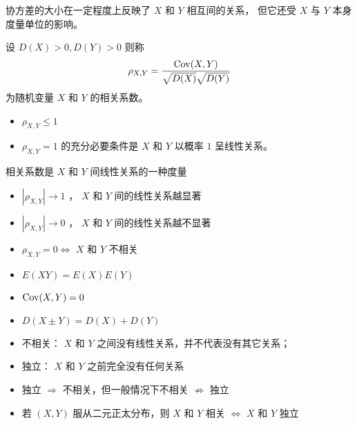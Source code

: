  协方差的大小在一定程度上反映了 $ X $ 和 $ Y $ 相互间的关系，
但它还受 $ X $ 与 $ Y $ 本身度量单位的影响。

 设 $ D(X) > 0, D(Y) > 0 $ 则称
\begin{equation}
    \rho_{X,Y} = \frac{\mathrm{Cov}(X,Y)}{\sqrt{D(X)}\sqrt{D(Y)}}
\end{equation}
为随机变量 $ X $ 和 $ Y $ 的相关系数。

\begin{itemize}[leftmargin=\subparitemindent]
    \item $ \rho_{X,Y} \leqslant 1 $
    \item $ \rho_{X,Y} = 1 $ 的充分必要条件是 $ X $ 和 $ Y $ 以概率 $ 1 $ 呈线性关系。
\end{itemize}

 相关系数是 $ X $ 和 $ Y $ 间线性关系的一种度量
\begin{itemize}[leftmargin=\subparitemindent]
    \item $ \left| \rho_{X,Y} \right| \rightarrow 1 $ ， $ X $ 和 $ Y $ 间的线性关系越显著
    \item $ \left| \rho_{X,Y} \right| \rightarrow 0 $ ， $ X $ 和 $ Y $ 间的线性关系越不显著
\end{itemize}

\begin{itemize}[leftmargin=\subparitemindent]
    \item $ \rho_{X,Y} = 0 \Leftrightarrow $ $ X $ 和 $ Y $ 不相关
    \item $ E(XY) = E(X)E(Y) $
    \item $ \mathrm{Cov}(X,Y) = 0 $
    \item $ D(X \pm Y) = D(X) + D(Y) $
\end{itemize}

\begin{itemize}[leftmargin=\subparitemindent]
    \item 不相关： $ X $ 和 $ Y $ 之间没有线性关系，并不代表没有其它关系；
    \item 独立： $ X $ 和 $ Y $ 之前完全没有任何关系
    \item 独立 $ \Rightarrow $ 不相关，但一般情况下不相关 $ \nRightarrow $ 独立
    \item 若 $ (X,Y) $ 服从二元正太分布，则 $ X $ 和 $ Y $ 相关 $ \Leftrightarrow $  $ X $ 和 $ Y $  独立
\end{itemize}

